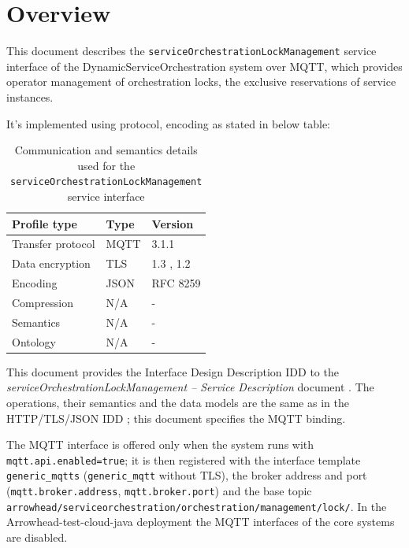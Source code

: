 \documentclass[a4paper]{arrowhead}
\begin{document}
\section{Overview}
\label{sec:overview}

This document describes the \texttt{service\allowbreak{}Orchestration\allowbreak{}Lock\allowbreak{}Management} service interface of the DynamicServiceOrchestration system over MQTT, which provides operator management of orchestration locks, the exclusive reservations of service instances.

It's implemented using protocol, encoding as stated in below table:
\begin{table}[ht!]
  \centering
  \begin{tabular}{|l|l|l|}
    \hline
    \rowcolor{gray!33} Profile type & Type & Version \\ \hline
    Transfer protocol & MQTT & 3.1.1 \cite{mqtt311} \\ \hline
    Data encryption & TLS & 1.3 \cite{rfc8446}, 1.2 \cite{rfc5246} \\ \hline
    Encoding & JSON & RFC 8259 \cite{rfc8259} \\ \hline
    Compression & N/A & - \\ \hline
    Semantics & N/A & - \\ \hline
    Ontology & N/A & - \\ \hline
  \end{tabular}
  \caption{Communication and semantics details used for the \texttt{service\allowbreak{}Orchestration\allowbreak{}Lock\allowbreak{}Management} service interface}
  \label{tab:comunication_semantics_profile}
\end{table}

This document provides the Interface Design Description IDD to the \textit{serviceOrchestrationLockManagement -- Service Description} document \cite{dso-serviceOrchestrationLockManagement-sd}.
The operations, their semantics and the data models are the same as in the HTTP/TLS/JSON IDD \cite{dso-serviceOrchestrationLockManagement-http-idd}; this document specifies the MQTT binding.

The MQTT interface is offered only when the system runs with \texttt{mqtt.api.enabled=true}; it is then registered with the interface template \texttt{generic\_\allowbreak{}mqtts} (\texttt{generic\_\allowbreak{}mqtt} without TLS), the broker address and port (\texttt{mqtt.\allowbreak{}broker.\allowbreak{}address}, \texttt{mqtt.\allowbreak{}broker.\allowbreak{}port}) and the base topic \texttt{arrowhead/\allowbreak{}serviceorchestration/\allowbreak{}orchestration/\allowbreak{}management/\allowbreak{}lock/\allowbreak{}}. In the Arrowhead-test-cloud-java deployment the MQTT interfaces of the core systems are disabled.
\end{document}
